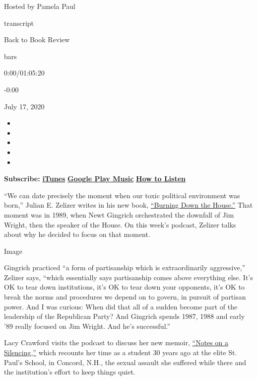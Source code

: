 Hosted by Pamela Paul

transcript

Back to Book Review

bars

0:00/01:05:20

-0:00

July 17, 2020

\begin{itemize}
\item
\item
\item
\item
\item
\end{itemize}

\textbf{Subscribe:}
\textbf{\href{https://itunes.apple.com/us/podcast/book-review/id120315179?mt=2}{iTunes}}
\textbf{\textbar{}}
\textbf{\href{https://play.google.com/music/listen?u=0\#/ps/Iv6zeb5qwjtzjfbyo3vy5zny5ky}{Google
Play Music}} \textbf{\textbar{}}
\textbf{\href{https://www.nytimes3xbfgragh.onion/2018/08/03/books/review/how-to-listen-to-the-book-review-podcast.html}{How
to Listen}}

``We can date precisely the moment when our toxic political environment
was born,'' Julian E. Zelizer writes in his new book,
\href{https://www.nytimes3xbfgragh.onion/2020/07/07/books/review/burning-down-the-house-julian-zelizer.html}{``Burning
Down the House.''} That moment was in 1989, when Newt Gingrich
orchestrated the downfall of Jim Wright, then the speaker of the House.
On this week's podcast, Zelizer talks about why he decided to focus on
that moment.

Image

Gingrich practiced ``a form of partisanship which is extraordinarily
aggressive,'' Zelizer says, ``which essentially says partisanship comes
above everything else. It's OK to tear down institutions, it's OK to
tear down your opponents, it's OK to break the norms and procedures we
depend on to govern, in pursuit of partisan power. And I was curious:
When did that all of a sudden become part of the leadership of the
Republican Party? And Gingrich spends 1987, 1988 and early '89 really
focused on Jim Wright. And he's successful.''

Lacy Crawford visits the podcast to discuss her new memoir,
\href{https://www.nytimes3xbfgragh.onion/2020/07/07/books/review/notes-on-a-silencing-lacy-crawford.html}{``Notes
on a Silencing,''} which recounts her time as a student 30 years ago at
the elite St. Paul's School, in Concord, N.H., the sexual assault she
suffered while there and the institution's effort to keep things quiet.

